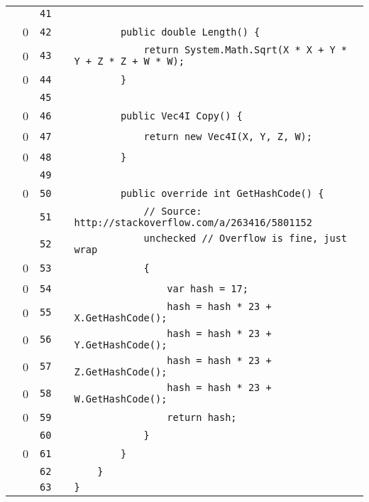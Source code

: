 \documentclass[a4paper,landscape,10pt]{article}
\begin{document}
\begin{longtable}[l]{lrrll}
\cellcolor{gray} &  & \verb~41~ & & \verb~~\\
\cellcolor{red} & 0 & \verb~42~ & & \verb~        public double Length() {~\\
\cellcolor{red} & 0 & \verb~43~ & & \verb~            return System.Math.Sqrt(X * X + Y * Y + Z * Z + W * W);~\\
\cellcolor{red} & 0 & \verb~44~ & & \verb~        }~\\
\cellcolor{gray} &  & \verb~45~ & & \verb~~\\
\cellcolor{red} & 0 & \verb~46~ & & \verb~        public Vec4I Copy() {~\\
\cellcolor{red} & 0 & \verb~47~ & & \verb~            return new Vec4I(X, Y, Z, W);~\\
\cellcolor{red} & 0 & \verb~48~ & & \verb~        }~\\
\cellcolor{gray} &  & \verb~49~ & & \verb~~\\
\cellcolor{red} & 0 & \verb~50~ & & \verb~        public override int GetHashCode() {~\\
\cellcolor{gray} &  & \verb~51~ & & \verb~            // Source: http://stackoverflow.com/a/263416/5801152~\\
\cellcolor{gray} &  & \verb~52~ & & \verb~            unchecked // Overflow is fine, just wrap~\\
\cellcolor{red} & 0 & \verb~53~ & & \verb~            {~\\
\cellcolor{red} & 0 & \verb~54~ & & \verb~                var hash = 17;~\\
\cellcolor{red} & 0 & \verb~55~ & & \verb~                hash = hash * 23 + X.GetHashCode();~\\
\cellcolor{red} & 0 & \verb~56~ & & \verb~                hash = hash * 23 + Y.GetHashCode();~\\
\cellcolor{red} & 0 & \verb~57~ & & \verb~                hash = hash * 23 + Z.GetHashCode();~\\
\cellcolor{red} & 0 & \verb~58~ & & \verb~                hash = hash * 23 + W.GetHashCode();~\\
\cellcolor{red} & 0 & \verb~59~ & & \verb~                return hash;~\\
\cellcolor{gray} &  & \verb~60~ & & \verb~            }~\\
\cellcolor{red} & 0 & \verb~61~ & & \verb~        }~\\
\cellcolor{gray} &  & \verb~62~ & & \verb~    }~\\
\cellcolor{gray} &  & \verb~63~ & & \verb~}~\\
\end{longtable}
\newpage
\end{document}
